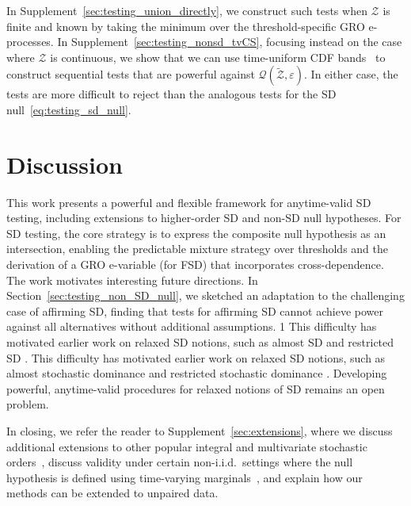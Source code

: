 \documentclass[12pt,twoside]{article}
\theoremstyle{plain}
\theoremstyle{definition}
\theoremstyle{remark}
\newcommand{\calQ}{\mathcal{Q}}
\newcommand{\calZ}{\mathcal{Z}}
\renewcommand{\epsilon}{\varepsilon}
\newcommand{\arxiv}{1}
\begin{document}
In Supplement~\ref{sec:testing_union_directly}, we construct such tests when $\calZ$ is finite and known by taking the minimum over the threshold-specific GRO e-processes.
In Supplement~\ref{sec:testing_nonsd_tvCS}, focusing instead on the case where $\calZ$ is continuous, we show that we can use time-uniform CDF bands~\citep[e.g.,][]{howard2022sequential,manole2023martingale,clerico2026uniform} to construct sequential tests that are powerful against $\calQ(\tilde{\calZ}, \epsilon)$. 
In either case, the tests are more difficult to reject than the analogous tests for the SD null~\eqref{eq:testing_sd_null}.



\section{Discussion}\label{sec:discussion}

This work presents a powerful and flexible framework for anytime-valid SD testing, including extensions to higher-order SD and non-SD null hypotheses. 
For SD testing, the core strategy is to express the composite null hypothesis as an intersection, enabling the predictable mixture strategy over thresholds and the derivation of a GRO e-variable (for FSD) that incorporates cross-dependence. 
The work motivates interesting future directions. 
In Section~\ref{sec:testing_non_SD_null}, we sketched an adaptation to the challenging case of affirming SD, finding that tests for affirming SD cannot achieve power against all alternatives without additional assumptions. 
\if\arxiv1%
{This difficulty has motivated earlier work on relaxed SD notions, such as almost SD \citep{baillo2024tests,leshno2002preferred} and restricted SD \citep{davidson2013testing}.} 
\else%
{This difficulty has motivated earlier work on relaxed SD notions, such as almost stochastic dominance \citep{baillo2024tests,leshno2002preferred} and restricted stochastic dominance \citep{davidson2013testing}.} \fi
Developing powerful, anytime-valid procedures for relaxed notions of SD remains an open problem. 


In closing, we refer the reader to Supplement~\ref{sec:extensions}, where we discuss additional extensions to other popular integral and multivariate stochastic orders~\citep{shaked2007stochastic}, discuss validity under certain non-i.i.d.\ settings where the null hypothesis is defined using time-varying marginals~\citep{mineiro2023nonstationarity}, and explain how our methods can be extended to unpaired data. 
\end{document}
